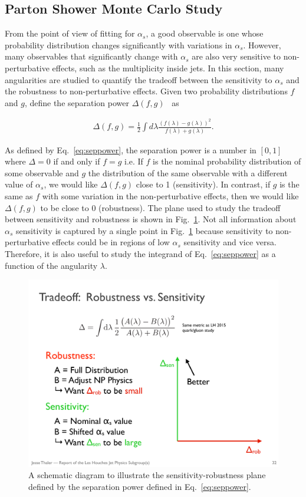 \subsection{Parton Shower Monte Carlo Study}

From the point of view of fitting for $\alpha_s$, a good observable is one whose probability distribution changes significantly with variations in $\alpha_s$.  However, many observables that significantly change with $\alpha_s$ are also very sensitive to non-perturbative effects, such as the multiplicity inside jets.  In this section, many angularities are studied to quantify the tradeoff between the sensitivity to $\alpha_s$ and the robustness to non-perturbative effects.  Given two probability distributions $f$ and $g$, define the separation power $\Delta(f,g)$~\cite{Harrison:1998yr} as

\begin{align}
\label{eq:seppower}
\Delta(f,g)=\frac{1}{2}\int d\lambda \frac{(f(\lambda)-g(\lambda))^2}{f(\lambda)+g(\lambda)}.
\end{align}

\noindent As defined by Eq.~\ref{eq:seppower}, the separation power is
a number in $[0,1]$ where $\Delta=0$ if and only if $f=g$ i.e.  If $f$ is the nominal probability distribution of some observable and $g$ the distribution of the same observable with a different value of $\alpha_s$, we would like $\Delta(f,g)$ close to 1 (sensitivity).  In contrast, if $g$ is the same as $f$ with some variation in the non-perturbative effects, then we would like $\Delta(f,g)$ to be close to $0$ (robustness).  The plane used to study the tradeoff between sensitivity and robustness is shown in Fig.~\ref{fig:robustnessschematic}.  Not all information about $\alpha_s$ sensitivity is captured by a single point in Fig.~\ref{fig:robustnessschematic} because sensitivity to non-perturbative effects could be in regions of low $\alpha_s$ sensitivity and vice versa.  Therefore, it is also useful to study the integrand of Eq.~\ref{eq:seppower} as a function of the angularity $\lambda$.

\begin{figure}[h!]
\begin{center}
\includegraphics[width = 0.4\columnwidth]{figures/robustnessschematic.pdf}
\end{center}
\caption{A schematic diagram to illustrate the sensitivity-robustness plane defined by the separation power defined in Eq.~\ref{eq:seppower}.}
\label{fig:robustnessschematic}
\end{figure}

